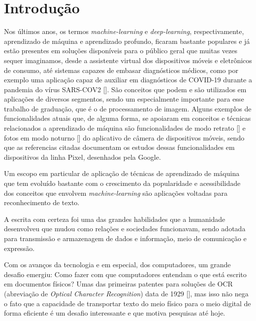 
\chapter[Introdução]{Introdução}

Nos últimos anos, os termos \textit{machine-learning} e \textit{deep-learning}, respectivamente, aprendizado de máquina e aprendizado profundo, ficaram bastante populares e já estão presentes em soluções disponíveis para o público geral que muitas vezes sequer imaginamos, desde a assistente virtual dos dispositivos móveis e eletrônicos de consumo, até sistemas capazes de embasar diagnósticos médicos, como por exemplo uma aplicação capaz de auxiliar em diagnósticos de COVID-19 durante a pandemia do vírus SARS-COV2 []. São conceitos que podem e são utilizados em aplicações de diversos segmentos, sendo um especialmente importante para esse trabalho de graduação, que é o de processamento de imagem. Alguns exemplos de funcionalidades atuais que, de alguma forma, se apoiaram em conceitos e técnicas relacionados a aprendizado de máquina são funcionalidades de modo retrato [] e fotos em modo noturno [] do aplicativo de câmera de dispositivos móveis, sendo que as referencias citadas documentam os estudos dessas funcionalidades em dispositivos da linha Pixel, desenhados pela Google.

Um escopo em particular de aplicação de técnicas de aprendizado de máquina que tem evoluído bastante com o crescimento da popularidade e acessibilidade dos conceitos que envolvem \textit{machine-learning} são aplicações voltadas para reconhecimento de texto. 

A escrita com certeza foi uma das grandes habilidades que a humanidade desenvolveu que mudou como relações e sociedades funcionavam, sendo adotada para transmissão e armazenagem de dados e informação, meio de comunicação e expressão.

Com os avanços da tecnologia e em especial, dos computadores, um grande desafio emergiu: Como fazer com que computadores entendam o que está escrito em documentos físicos? Umas das primeiras patentes para soluções de OCR (abreviação de \textit{Optical Character Recognition}) data de 1929 [], mas isso não nega o fato que a capacidade de transportar texto do meio físico para o meio digital de forma eficiente é um desafio interessante e que motiva pesquisas até hoje.

